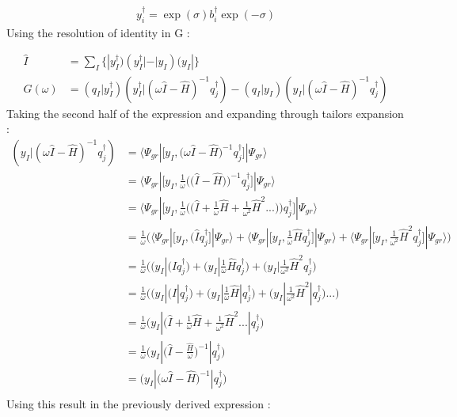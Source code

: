 \documentclass[11pt, oneside]{article}   	%
\begin{document}
\begin{equation*}\label{eq:unitary transformed excitation}
  \begin{aligned}
    y_i^\dagger=\exp(\sigma) b_i^\dagger \exp(- \sigma)
  \end{aligned}
\end{equation*}
Using the resolution of identity in G :

\begin{equation*}\label{eq:resolution of identity}
  \begin{aligned}
    \hat I&=\sum_I \{ |y_I^\dagger)(y_I^\dagger|-|y_I)(y_I|\}\\
    G(\omega)&=(q_I|y_I^\dagger)(y_I^\dagger|(\omega \hat I - \hat H)^{-1}q_j^\dagger) - (q_I|y_I)(y_I|(\omega \hat I - \hat H)^{-1}q_j^\dagger)
  \end{aligned}
\end{equation*}
Taking the second half of the expression and expanding through tailors expansion :
\begin{equation*}\label{eq:resolution of identity}
  \begin{aligned}
    (y_I|(\omega \hat I - \hat H)^{-1}q_j^\dagger) &=\big \langle \Psi_{gr} |\big[ y_I , \big(\omega \hat I-\hat H \big)^{-1} q_j^\dagger \big] | \Psi_{gr}\big \rangle \\ 
     &=\big \langle \Psi_{gr} |\big[ y_I , \frac{1}{ \omega} \Bigg( \big( \hat I-\hat H \big)\Bigg)^{-1} q_j^\dagger \big] | \Psi_{gr}\big \rangle \\ 
     &=\big \langle \Psi_{gr} |\big[ y_I , \frac{1}{\omega} \Bigg( \big( \hat I+ \frac{1}{ \omega} \hat H + \frac{1}{\omega^2}\hat H^2 ...\big)\Bigg) q_j^\dagger \big] | \Psi_{gr}\big \rangle \\ 
     &=\frac{1}{\omega }\Bigg(\big \langle \Psi_{gr} |\big[ y_I , \big( \hat I q_j^\dagger \big] | \Psi_{gr}\big \rangle +\big \langle \Psi_{gr} |\big[ y_I , \frac{1}{\omega}\hat H  q_j^\dagger \big] | \Psi_{gr}\big \rangle  +\big \langle \Psi_{gr} |\big[ y_I ,\frac{1}{\omega^2} \hat H^2  q_j^\dagger \big] | \Psi_{gr}\big \rangle \Bigg)\\ 
     &=\frac{1}{\omega} \Bigg(\big( y_I | \big( \hat I q_j^\dagger \big) +\big( y_I | \frac{1}{\omega}\hat H  q_j^\dagger \big) +\big( y_I |\frac{1}{\omega^2} \hat H^2  q_j^\dagger \big)\\ 
     &=\frac{1}{\omega} \Bigg(\big( y_I | \big( \hat I| q_j^\dagger \big) +\big( y_I | \frac{1}{\omega}\hat H | q_j^\dagger \big) +\big( y_I |\frac{1}{\omega^2} \hat H^2|  q_j^\dagger \big)...\Bigg)\\ 
     &=\frac{1}{\omega} \big( y_I | \big( \hat I + \frac{1}{\omega}\hat H + \frac{1}{\omega^2} \hat H^2 ...|  q_j^\dagger \big)\\ 
     &=\frac{1}{\omega} \big( y_I | \big( \hat I - \frac{\hat H}{\omega}\big)^{-1}|  q_j^\dagger \big)\\ 
     &= \big( y_I | \big( \omega\hat I - \hat H\big)^{-1}|  q_j^\dagger \big)\\ 
  \end{aligned}
\end{equation*}
Using this result in the previously derived expression :
\end{document}
